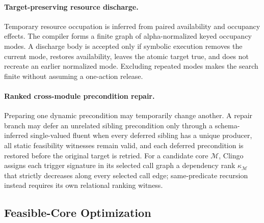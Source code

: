 \paragraph{Target-preserving resource discharge.}
Temporary resource occupation is inferred from paired availability and
occupancy effects. The compiler forms a finite graph of alpha-normalized keyed
occupancy modes. A discharge body is accepted only if symbolic execution
removes the current mode, restores availability, leaves the atomic target true,
and does not recreate an earlier normalized mode. Excluding repeated modes
makes the search finite without assuming a one-action release.

\paragraph{Ranked cross-module precondition repair.}
Preparing one dynamic precondition may temporarily change another. A repair
branch may defer an unrelated sibling precondition
only through a schema-inferred single-valued fluent when every deferred sibling
has a unique producer, all static feasibility witnesses remain valid, and each deferred
precondition is restored before the original target is retried. For a candidate core
$\mathcal M$, Clingo assigns each trigger signature in its selected call graph
a dependency rank $\kappa_{\mathcal M}$ that strictly decreases along every
selected call edge; same-predicate recursion instead requires its own relational
ranking witness.

\subsection{Feasible-Core Optimization}

